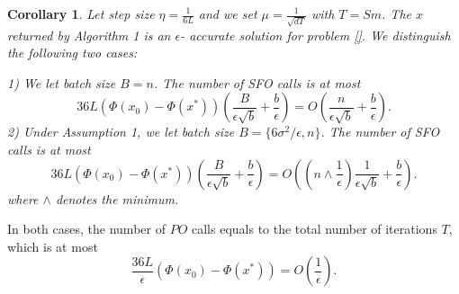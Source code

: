 \documentclass{article}
\newtheorem{corollary}[theorem]{Corollary}
\theoremstyle{definition}
\theoremstyle{remark}
\begin{document}
\begin{corollary}\label{corr11}
Let step size $\eta=\frac{1}{6L}$ and we set $\mu = \frac{1}{\sqrt{dT}}$ with $T = Sm$. The $\hat{x}$ returned by Algorithm 1  is an $\epsilon$- accurate solution for problem \ref{}. We distinguish the following two cases:

1) We let batch size $B=n$. The number of SFO calls is at most 
\[
36 L (\Phi(x_0)-\Phi(x^*))\left(\frac{B}{\epsilon\sqrt{b}}+\frac{b}{\epsilon}\right) = O\left(\frac{n}{\epsilon \sqrt{b}}+\frac{b}{\epsilon}\right).
\]
2) Under Assumption 1, we let batch size $B = \{6\sigma^2/\epsilon, n\}$. The number of SFO calls is at most 
\[
36 L (\Phi(x_0)-\Phi(x^*))\left(\frac{B}{\epsilon\sqrt{b}}+\frac{b}{\epsilon}\right) = O\left((n\wedge \frac{1}{\epsilon})\frac{1}{\epsilon \sqrt{b}}+\frac{b}{\epsilon}\right).
\]
where $\wedge$ denotes the minimum.
\end{corollary}
In both cases, the number of $PO$ calls equals to the total number of iterations $T$, which is at most
\[
\frac{36 L}{\epsilon}(\Phi(x_0)-\Phi(x^*)) = O\left(\frac{1}{\epsilon}\right).
\] 
\end{document}
